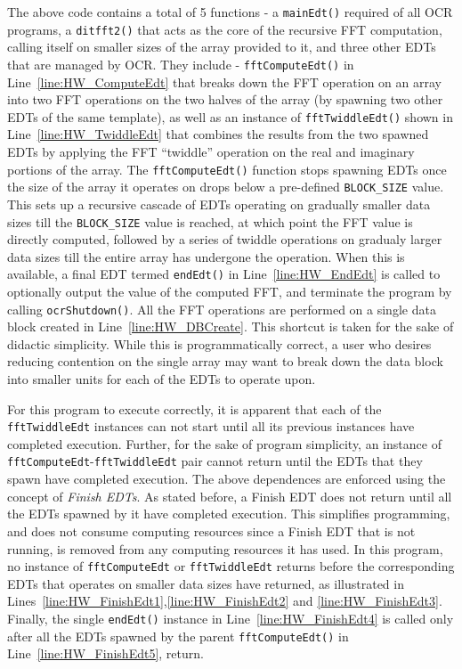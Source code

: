 The above code contains a total of 5 functions - a \texttt{mainEdt()} required of all
OCR programs, a \texttt{ditfft2()} that acts as the core of the recursive FFT
computation, calling itself on smaller sizes of the array provided to it, and three
other EDTs that are managed by OCR. They include - \texttt{fftComputeEdt()} in
Line~\ref{line:HW_ComputeEdt} that breaks down the FFT operation on an array into
two FFT operations on the two halves of the array (by spawning two other EDTs of
the same template), as well as an instance of \texttt{fftTwiddleEdt()} shown in
Line~\ref{line:HW_TwiddleEdt} that combines the
results from the two spawned EDTs by applying the FFT ``twiddle'' operation on the
real and imaginary portions of the array. The \texttt{fftComputeEdt()} function stops
spawning EDTs once the size of the array it operates on drops below a pre-defined
\texttt{BLOCK\_SIZE} value. This sets up a recursive cascade of EDTs operating on gradually
smaller data sizes till the \texttt{BLOCK\_SIZE} value is reached, at which point the FFT value
is directly computed, followed by a series of twiddle operations on gradualy larger
data sizes till the entire array has undergone the operation. When this is available,
a final EDT termed \texttt{endEdt()} in Line~\ref{line:HW_EndEdt} is called to
optionally output the value of the
computed FFT, and terminate the program by calling \texttt{ocrShutdown()}. All the
FFT operations are performed on a single data block created in Line~\ref{line:HW_DBCreate}.
This shortcut is taken for the sake of didactic simplicity. While this is
programmatically correct, a user who desires reducing contention on the single array
may want to break down the data block into smaller units for each of the EDTs to operate
upon.

For this program to execute correctly, it is apparent that each of the
\texttt{fftTwiddleEdt} instances can not start until all its previous instances have
completed execution. Further, for the sake of program simplicity, an instance of
\texttt{fftComputeEdt}-\texttt{fftTwiddleEdt} pair cannot return until the EDTs that
they spawn have completed execution. The above dependences are enforced using the
concept of \emph{Finish EDTs}. As stated before, a Finish EDT does not return until
all the EDTs spawned by it have completed execution. This simplifies programming,
and does not consume computing resources since a Finish EDT that is not running, is
removed from any computing resources it has used. In this program, no instance of
\texttt{fftComputeEdt} or \texttt{fftTwiddleEdt} returns before the corresponding
EDTs that operates on smaller data sizes have returned, as illustrated in
Lines~\ref{line:HW_FinishEdt1},\ref{line:HW_FinishEdt2} and \ref{line:HW_FinishEdt3}.
Finally, the single \texttt{endEdt()} instance in Line~\ref{line:HW_FinishEdt4} is called
only after all the EDTs spawned by the parent \texttt{fftComputeEdt()}
in Line~\ref{line:HW_FinishEdt5}, return.
